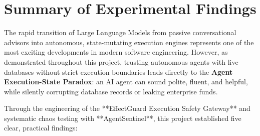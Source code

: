 
\section{Summary of Experimental Findings}

The rapid transition of Large Language Models from passive conversational advisors into autonomous, state-mutating execution engines represents one of the most exciting developments in modern software engineering. However, as demonstrated throughout this project, trusting autonomous agents with live databases without strict execution boundaries leads directly to the \textbf{Agent Execution-State Paradox}: an AI agent can sound polite, fluent, and helpful, while silently corrupting database records or leaking enterprise funds.

Through the engineering of the **EffectGuard Execution Safety Gateway** and systematic chaos testing with **AgentSentinel**, this project established five clear, practical findings:

